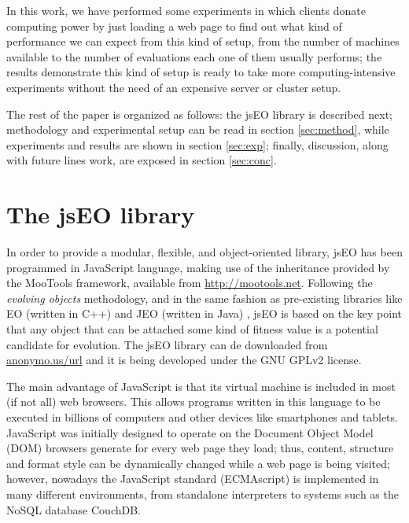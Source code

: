 \documentclass[runningheads,a4paper]{llncs}
\begin{document}
In this work, we have performed some experiments in which clients donate
computing power by just loading a web page to find out what kind of
performance we can expect from this kind of setup, from the number of
machines available to the number of evaluations each one of them
usually performs; the results demonstrate this kind of setup is ready to take more
computing-intensive experiments without the need of an expensive server or cluster
setup. 



The rest of the paper is organized as follows: the jsEO library is described next;  methodology and experimental setup can be read  in section \ref{sec:method}, while experiments and results are shown in section 
\ref{sec:exp}; finally, discussion, along with future lines work, are exposed in section \ref{sec:conc}.

\section{The jsEO library}
\label{sec:jseo}
In order to provide a modular, flexible, and object-oriented library,
jsEO has been programmed in JavaScript language, making use of the
inheritance provided by the MooTools framework, available from
\url{http://mootools.net}.  %
Following the {\em evolving objects}
methodology, and in the same fashion as pre-existing
libraries like EO (written in C++) \cite{EO:FEA2000} and JEO (written
in Java) \cite{maribel:jp2001}, 
jsEO is based on the key point that any object that can be attached
some kind of fitness value is a potential candidate for evolution. The
jsEO library can de downloaded from 
\url{anonymo.us/url}
and it
is being developed under the GNU GPLv2 license. 

The main advantage of JavaScript  is that its virtual machine is
included  in most (if not all) web browsers. This allows programs
written in this language to be executed in billions of computers and
other devices like smartphones and tablets. JavaScript was initially 
designed to operate on the Document Object Model (DOM) browsers
generate for every web page they load; thus, content, structure and
format style can be dynamically changed while a web page is being
visited; however, nowadays the JavaScript standard (ECMAscript) is
implemented in many different environments, from standalone
interpreters to systems such as the NoSQL database CouchDB. 
\end{document}
